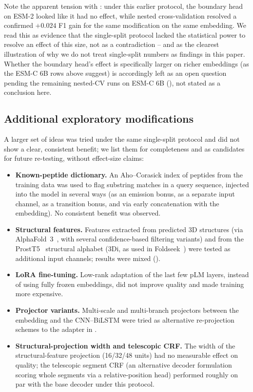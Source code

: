 \documentclass{article}
\begin{document}
Note the apparent tension with : under this earlier protocol, the boundary head on ESM-2 looked like it had no effect, while nested cross-validation resolved a confirmed $+0.024$ F1 gain for the same modification on the same embedding. We read this as evidence that the single-split protocol lacked the statistical power to resolve an effect of this size, not as a contradiction -- and as the clearest illustration of why we do not treat single-split numbers as findings in this paper. Whether the boundary head's effect is specifically larger on richer embeddings (as the ESM-C 6B rows above suggest) is accordingly left as an open question pending the remaining nested-CV runs on ESM-C 6B (), not stated as a conclusion here.

\subsection{Additional exploratory modifications}

A larger set of ideas was tried under the same single-split protocol and did not show a clear, consistent benefit; we list them for completeness and as candidates for future re-testing, without effect-size claims:

\begin{itemize}
  \item \textbf{Known-peptide dictionary.} An Aho--Corasick index of peptides from the training data was used to flag substring matches in a query sequence, injected into the model in several ways (as an emission bonus, as a separate input channel, as a transition bonus, and via early concatenation with the embedding). No consistent benefit was observed.
  \item \textbf{Structural features.} Features extracted from predicted 3D structures (via AlphaFold~3~\citep{alphafold3_2024}, with several confidence-based filtering variants) and from the ProstT5~\citep{heinzinger2023prostt5} structural alphabet (3Di, as used in Foldseek~\citep{vankempen2024foldseek}) were tested as additional input channels; results were mixed ().
  \item \textbf{LoRA fine-tuning.} Low-rank adaptation of the last few pLM layers, instead of using fully frozen embeddings, did not improve quality and made training more expensive.
  \item \textbf{Projector variants.} Multi-scale and multi-branch projectors between the embedding and the CNN--BiLSTM were tried as alternative re-projection schemes to the adapter in .
  \item \textbf{Structural-projection width and telescopic CRF.} The width of the structural-feature projection (16/32/48 units) had no measurable effect on quality; the telescopic segment CRF (an alternative decoder formulation scoring whole segments via a relative-position head) performed roughly on par with the base decoder under this protocol.
\end{itemize}
\end{document}
